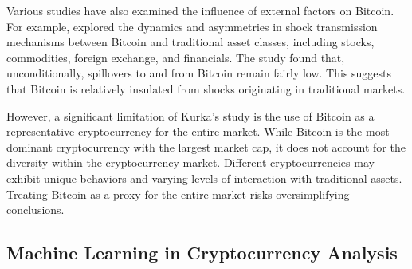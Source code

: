 Various studies have also examined the influence of external factors on Bitcoin. For example, \autocite{kurka2019cryptocurrencies} explored the dynamics and asymmetries in shock transmission mechanisms between Bitcoin and traditional asset classes, including stocks, commodities, foreign exchange, and financials. The study found that, unconditionally, spillovers to and from Bitcoin remain fairly low. This suggests that Bitcoin is relatively insulated from shocks originating in traditional markets.

However, a significant limitation of Kurka's study is the use of Bitcoin as a representative cryptocurrency for the entire market. While Bitcoin is the most dominant cryptocurrency with the largest market cap, it does not account for the diversity within the cryptocurrency market. Different cryptocurrencies may exhibit unique behaviors and varying levels of interaction with traditional assets. Treating Bitcoin as a proxy for the entire market risks oversimplifying conclusions.
\subsection{Machine Learning in Cryptocurrency Analysis}


